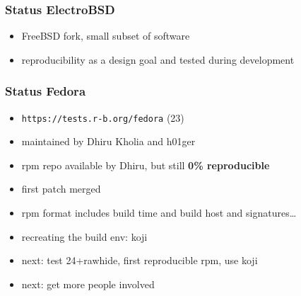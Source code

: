 \documentclass[14pt,aspectratio=169]{beamer}
\begin{document}
\begin{frame}
 \frametitle{Status ElectroBSD}
 \begin{itemize}
  \item FreeBSD fork, small subset of software
  \item reproducibility as a design goal and tested during development
 \end{itemize}
\end{frame}


\begin{frame}
 \frametitle{Status Fedora}
 \begin{itemize}
  \item \texttt{https://tests.r-b.org/fedora} (23)
  \item maintained by Dhiru Kholia and h01ger
  \item rpm repo available by Dhiru, but still \textbf{0\% reproducible}
  \item first patch merged
  \item rpm format includes build time and build host and signatures…
  \item recreating the build env: koji
  \item next: test 24+rawhide, first reproducible rpm, use koji
  \item next: get more people involved
 \end{itemize}
\end{frame}
\end{document}
